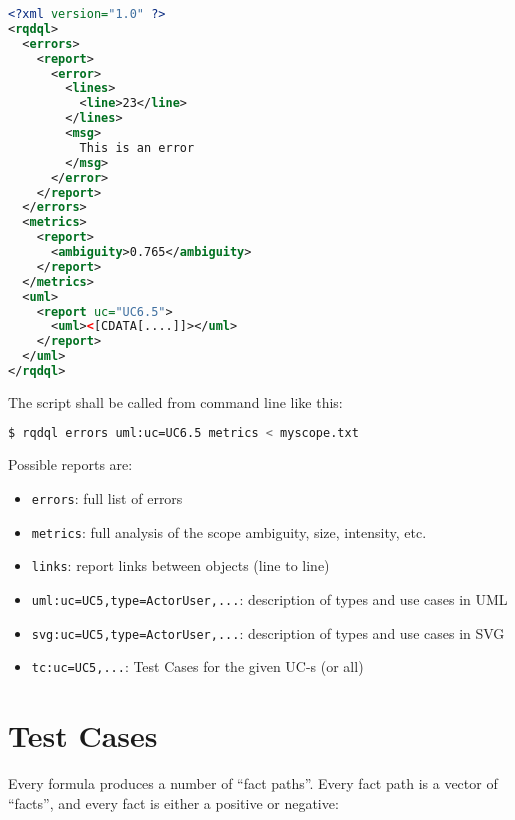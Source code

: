 \documentclass{article}
\begin{document}
    \begin{lstlisting}[language=XML]
<?xml version="1.0" ?>
<rqdql>
  <errors>
    <report>
      <error>
        <lines>
          <line>23</line>
        </lines>
        <msg>
          This is an error
        </msg>
      </error>
    </report>
  </errors>
  <metrics>
    <report>
      <ambiguity>0.765</ambiguity>
    </report>
  </metrics>
  <uml>
    <report uc="UC6.5">
      <uml><[CDATA[....]]></uml>
    </report>
  </uml>
</rqdql>
    \end{lstlisting}

    The script shall be called from command line like this:
    
    \begin{lstlisting}[language=bash]
$ rqdql errors uml:uc=UC6.5 metrics < myscope.txt
    \end{lstlisting}
    
    Possible reports are:
    
    \begin{itemize}
        \item \texttt{errors}: full list of errors
        \item \texttt{metrics}: full analysis of the scope ambiguity, size, intensity, etc.
        \item \texttt{links}: report links between objects (line to line)
        \item \texttt{uml:uc=UC5,type=ActorUser,...}: description of types and use cases in UML
        \item \texttt{svg:uc=UC5,type=ActorUser,...}: description of types and use cases in SVG
        \item \texttt{tc:uc=UC5,...}: Test Cases for the given UC-s (or all)
    \end{itemize}
    
\newpage
\section{Test Cases}

    Every formula produces a number of ``fact paths''. Every fact path
    is a vector of ``facts'', and every fact is either a positive or negative:
    
\end{document}

